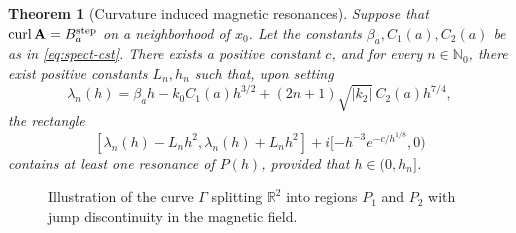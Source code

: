 \documentclass[11pt]{amsart}
\newtheorem{theorem}{Theorem}[section]
\theoremstyle{remark}
\newcommand{\bA}{\mathbf{A}}
\DeclareMathOperator{\Curl}{curl}
\numberwithin{equation}{section}
\begin{document}
\begin{theorem}[Curvature induced magnetic resonances]\label{thm:main*}
    Suppose that $\Curl\bA=B^{\rm step}_a$ on a neighborhood of $x_0$. Let the constants $\beta_a,C_1(a),C_2(a)$ be as in \eqref{eq:spect-cst}. There exists a positive constant $c$, 
    and for every  $n\in\mathbb N_0$, there exist positive constants $L_n,h_n$ such that, upon setting
    \[\lambda_n(h)=\beta_ah-k_0C_1(a)h^{3/2}+(2n+1)\sqrt{|k_2|}\,C_2(a)h^{7/4},\]
    the rectangle
\[
 [\lambda_n(h) - L_nh^{2}, \lambda_n(h) + L_nh^{2}] + i[-h^{-3}e^{-c/h^{1/8}}, 0)
\]
contains at least one resonance of $P(h)$, provided that $h\in(0,h_n]$.
\end{theorem}
%



\begin{figure}[htbp]
    \centering
    \caption{Illustration of the curve $\Gamma$ splitting $\mathbb{R}^2$ into regions $P_1$ and $P_2$ with jump discontinuity in the magnetic field.}
    \label{fig:geometry_config}
\end{figure}
\end{document}
